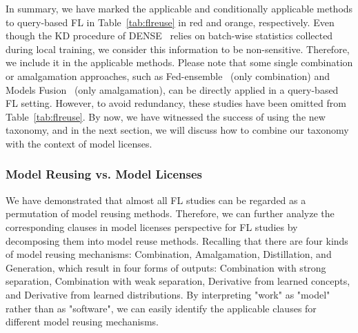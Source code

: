 
In summary, we have marked the applicable and conditionally applicable methods to query-based FL in Table~\ref{tab:flreuse} in red and orange, respectively.
Even though the KD procedure of DENSE~\cite{zhang2022dense} relies on batch-wise statistics collected during local training, we consider this information to be non-sensitive. 
Therefore, we include it in the applicable methods.
Please note that some single combination or amalgamation approaches, such as Fed-ensemble~\cite{shi2023fed} (only combination) and Models Fusion~\cite{yurochkin2019bayesian, yurochkin2019statistical, lam2021model} (only amalgamation), can be directly applied in a query-based FL setting. 
However, to avoid redundancy, these studies have been omitted from Table~\ref{tab:flreuse}.
By now, we have witnessed the success of using the new taxonomy, and in the next section, we will discuss how to combine our taxonomy with the context of model licenses.


\subsubsection{Model Reusing vs. Model Licenses}
\label{sec:reusing&license}
We have demonstrated that almost all FL studies can be regarded as a permutation of model reusing methods. 
Therefore, we can further analyze the corresponding clauses in model licenses perspective for FL studies by decomposing them into model reuse methods.
Recalling that there are four kinds of model reusing mechanisms: Combination, Amalgamation, Distillation, and Generation, which result in four forms of outputs: Combination with strong separation, Combination with weak separation, Derivative from learned concepts, and Derivative from learned distributions.
By interpreting "work" as "model" rather than as "software", we can easily identify the applicable clauses for different model reusing mechanisms.

